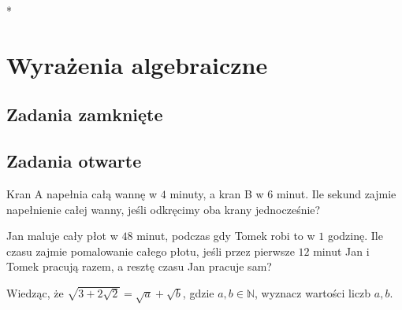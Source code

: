 *\setcounter{parc}{0}
\addtocounter{chapc}{1}

\chapter{Wyrażenia algebraiczne}

\section{Zadania zamknięte}

\section{Zadania otwarte}

\zadanie Kran A napełnia całą wannę w $4$ minuty, a kran B w $6$ minut. Ile sekund zajmie napełnienie całej wanny, jeśli odkręcimy oba krany jednocześnie?

\zadanie Jan maluje cały płot w $48$ minut, podczas gdy Tomek robi to w $1$ godzinę. Ile czasu zajmie pomalowanie całego płotu, jeśli przez pierwsze $12$ minut Jan i Tomek pracują razem, a resztę czasu Jan pracuje sam?

\zadanie Wiedząc, że $\sqrt{3 + 2\sqrt{2}} = \sqrt{a} + \sqrt{b}$, gdzie $a, b \in \mathbb{N}$, wyznacz wartości liczb $a, b$. %

